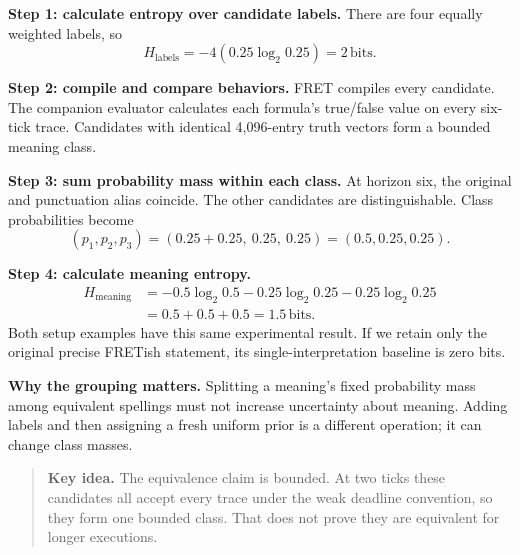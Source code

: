 \documentclass[11pt,a4paper]{article}
\newcommand{\key}[1]{\begin{quote}\color{teal}\textbf{Key idea.} #1\end{quote}}
\newcommand{\bits}{\,\mathrm{bits}}
\begin{document}
\textbf{Step 1: calculate entropy over candidate labels.}
There are four equally weighted labels, so
\[
H_{\mathrm{labels}}=-4(0.25\log_2 0.25)=2\bits.
\]

\textbf{Step 2: compile and compare behaviors.}
FRET compiles every candidate. The companion evaluator calculates each formula's true/false value on every six-tick trace. Candidates with identical 4,096-entry truth vectors form a bounded meaning class.

\textbf{Step 3: sum probability mass within each class.}
At horizon six, the original and punctuation alias coincide. The other candidates are distinguishable. Class probabilities become
\[
(p_1,p_2,p_3)=(0.25+0.25,\ 0.25,\ 0.25)=(0.5,0.25,0.25).
\]

\textbf{Step 4: calculate meaning entropy.}
\begin{align*}
H_{\mathrm{meaning}}
&=-0.5\log_2 0.5-0.25\log_2 0.25-0.25\log_2 0.25\\
&=0.5+0.5+0.5=\boxed{1.5\bits}.
\end{align*}
Both setup examples have this same experimental result. If we retain only the original precise FRETish statement, its single-interpretation baseline is zero bits.

\textbf{Why the grouping matters.} Splitting a meaning's fixed probability mass among equivalent spellings must not increase uncertainty about meaning. Adding labels and then assigning a fresh uniform prior is a different operation; it can change class masses.

\key{The equivalence claim is bounded. At two ticks these candidates all accept every trace under the weak deadline convention, so they form one bounded class. That does not prove they are equivalent for longer executions.}
\newpage
\end{document}
